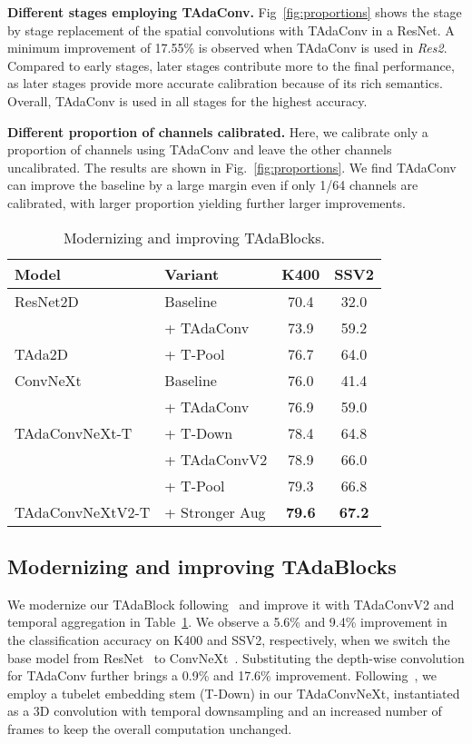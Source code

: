 \documentclass[10pt,journal,compsoc]{IEEEtran}
\newcommand{\tablestyle}[2]{\setlength{\tabcolsep}{#1}\renewcommand{\arraystretch}{#2}\centering\small}
\newcommand\graycell[0]{\cellcolor{midgrey}}
\begin{document}
\textbf{Different stages employing TAdaConv. } Fig~\ref{fig:proportions} shows the stage by stage replacement of the spatial convolutions with TAdaConv in a ResNet.
A minimum improvement of 17.55\% is observed when TAdaConv is used in \textit{Res2}.
Compared to early stages, later stages contribute more to the final performance, as later stages provide more accurate calibration because of its rich semantics.
Overall, TAdaConv is used in all stages for the highest accuracy. 

\textbf{Different proportion of channels calibrated. }Here, we calibrate only a proportion of channels using TAdaConv and leave the other channels uncalibrated. The results are shown in Fig.~\ref{fig:proportions}. 
We find TAdaConv can improve the baseline by a large margin even if only 1/64 channels are calibrated, with larger proportion yielding further larger improvements.

\begin{table}[t]
\caption{Modernizing and improving TAdaBlocks. }
\vspace{-3mm}
\centering
\tablestyle{6pt}{1.0}
\begin{tabular}{llcc}
\toprule
\footnotesize Model & \footnotesize Variant & \footnotesize K400 & \footnotesize SSV2 \\
\midrule
ResNet2D & Baseline & 70.4 & 32.0 \\
 & + TAdaConv & 73.9 & 59.2 \\
TAda2D & + T-Pool& 76.7 & 64.0 \\ 
\midrule
ConvNeXt & Baseline & 76.0 & 41.4 \\
{} & + TAdaConv & 76.9 & 59.0 \\
TAdaConvNeXt-T & + T-Down & 78.4 & 64.8 \\
\multicolumn{1}{l}{\multirow{2}{*}{}} & + TAdaConvV2 & 78.9 & 66.0 \\
 ~ & + T-Pool & 79.3 & 66.8\\
TAdaConvNeXtV2-T & + Stronger Aug & \graycell\bf 79.6 & \graycell\bf 67.2\\
\bottomrule
\end{tabular}
\label{tab:modernizing-tadablocks}
\end{table}

\subsection{Modernizing and improving TAdaBlocks}
We modernize our TAdaBlock following~\cite{convnext} and improve it with TAdaConvV2 and temporal aggregation in Table~\ref{tab:modernizing-tadablocks}. We observe a 5.6\% and 9.4\% improvement in the classification accuracy on K400 and SSV2, respectively, when we switch the base model from ResNet~\cite{resnet} to ConvNeXt~\cite{convnext}. Substituting the depth-wise convolution for TAdaConv further brings a 0.9\% and 17.6\% improvement. Following~\cite{arnab2021vivit,videoswin}, we employ a tubelet embedding stem (T-Down) in our TAdaConvNeXt, instantiated as a 3D convolution with temporal downsampling and an increased number of frames to keep the overall computation unchanged. 
\end{document}
